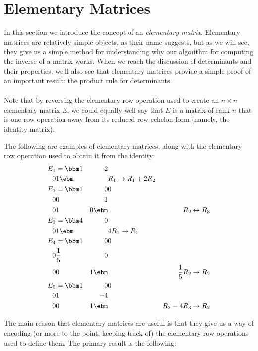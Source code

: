 \section{Elementary Matrices}\label{sec:elementary_matrices}

In this section we introduce the concept of an \textit{elementary matrix}. Elementary matrices are relatively simple objects, as their name suggests, but as we will see, they give us a simple method for understanding why our algorithm for computing the inverse of a matrix works. When we reach the discussion of determinants and their properties, we'll also see that elementary matrices provide a simple proof of an important result: the product rule for determinants.\\

\\


Note that by reversing the elementary row operation used to create an $n\times n$ elementary matrix $E$, we could equally well say that $E$ is a matrix of rank $n$ that is one row operation away from its reduced row-echelon form (namely, the identity matrix).

\medskip

The following are examples of elementary matrices, along with the elementary row operation used to obtain it from the identity:
\begin{align*}
E_1 & = \bbm 1&2\\0&1\ebm & & R_1\to R_1+2R_2\\
E_2 & = \bbm 1&0&0\\0&0&1\\0&1&0\ebm & & R_2\leftrightarrow R_3\\
E_3 & = \bbm 4&0\\0&1\ebm & & 4R_1\to R_1\\
E_4 & = \bbm 1&0&0\\0&\frac{1}{5}&0\\0&0&1\ebm & & \frac{1}{5}R_2\to R_2\\
E_5 & = \bbm 1&0&0\\0&1&-4\\0&0&1\ebm & & R_2-4R_3\to R_2
\end{align*}


The main reason that elementary matrices are useful is that they give us a way of encoding (or more to the point, keeping track of) the elementary row operations used to define them. The primary result is the following:\\

